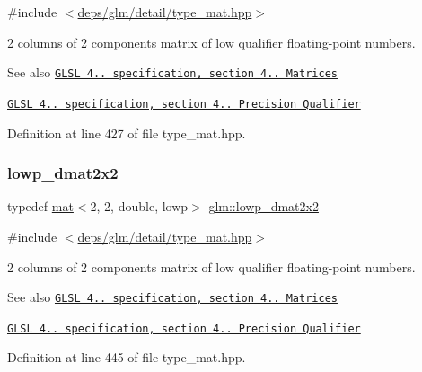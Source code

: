 {\ttfamily \#include $<$\hyperlink{type__mat_8hpp}{deps/glm/detail/type\+\_\+mat.\+hpp}$>$}

2 columns of 2 components matrix of low qualifier floating-\/point numbers.

\begin{DoxySeeAlso}{See also}
\href{http://www.opengl.org/registry/doc/GLSLangSpec.4.20.8.pdf}{\tt G\+L\+SL 4.. specification, section 4.. Matrices} 

\href{http://www.opengl.org/registry/doc/GLSLangSpec.4.20.8.pdf}{\tt G\+L\+SL 4.. specification, section 4.. Precision Qualifier} 
\end{DoxySeeAlso}


Definition at line 427 of file type\+\_\+mat.\+hpp.

\mbox{\label{group__core__precision_gaa0f01b1fb1a32ca63036ee3de89681d4}} 
\subsubsection{\texorpdfstring{lowp\+\_\+dmat2x2}{lowp\_dmat2x2}}
{\footnotesize\ttfamily typedef \hyperlink{structglm_1_1mat}{mat}$<$2, 2, double, lowp$>$ \hyperlink{group__core__precision_gaa0f01b1fb1a32ca63036ee3de89681d4}{glm\+::lowp\+\_\+dmat2x2}}



{\ttfamily \#include $<$\hyperlink{type__mat_8hpp}{deps/glm/detail/type\+\_\+mat.\+hpp}$>$}

2 columns of 2 components matrix of low qualifier floating-\/point numbers.

\begin{DoxySeeAlso}{See also}
\href{http://www.opengl.org/registry/doc/GLSLangSpec.4.20.8.pdf}{\tt G\+L\+SL 4.. specification, section 4.. Matrices} 

\href{http://www.opengl.org/registry/doc/GLSLangSpec.4.20.8.pdf}{\tt G\+L\+SL 4.. specification, section 4.. Precision Qualifier} 
\end{DoxySeeAlso}


Definition at line 445 of file type\+\_\+mat.\+hpp.

\mbox{\label{group__core__precision_gae5263863de4793ff33184db9a6bd3620}} 
